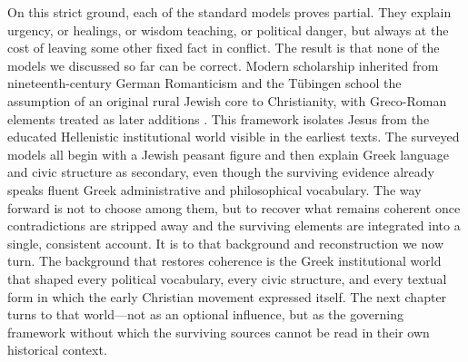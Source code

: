On this strict ground, each of the standard models proves partial.
They explain urgency, or healings, or wisdom teaching, or political danger, but always at the cost of leaving some other fixed fact in conflict.
The result is that none of the models we discussed so far can be correct.
Modern scholarship inherited from nineteenth-century German Romanticism and the Tübingen school the assumption of an original rural Jewish core to Christianity, with Greco-Roman elements treated as later additions \cite{schweitzer:quest}.
This framework isolates Jesus from the educated Hellenistic institutional world visible in the earliest texts.
The surveyed models all begin with a Jewish peasant figure and then explain Greek language and civic structure as secondary, even though the surviving evidence already speaks fluent Greek administrative and philosophical vocabulary.
The way forward is not to choose among them, but to recover what remains coherent once contradictions are stripped away and the surviving elements are integrated into a single, consistent account.
It is to that background and reconstruction we now turn.
The background that restores coherence is the Greek institutional world that shaped every political vocabulary, every civic structure, and every textual form in which the early Christian movement expressed itself.
The next chapter turns to that world---not as an optional influence, but as the governing framework without which the surviving sources cannot be read in their own historical context.

